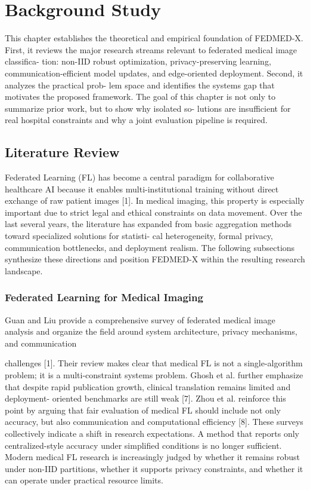 \chapter{Background Study}
This chapter establishes the theoretical and empirical foundation of FEDMED-X. First, it reviews the major research streams relevant to federated medical image classifica- tion: non-IID robust optimization, privacy-preserving learning, communication-efficient model updates, and edge-oriented deployment. Second, it analyzes the practical prob- lem space and identifies the systems gap that motivates the proposed framework. The goal of this chapter is not only to summarize prior work, but to show why isolated so- lutions are insufficient for real hospital constraints and why a joint evaluation pipeline is required.
\section{Literature Review}
Federated Learning (FL) has become a central paradigm for collaborative healthcare AI because it enables multi-institutional training without direct exchange of raw patient images [1]. In medical imaging, this property is especially important due to strict legal and ethical constraints on data movement. Over the last several years, the literature has expanded from basic aggregation methods toward specialized solutions for statisti- cal heterogeneity, formal privacy, communication bottlenecks, and deployment realism.
The following subsections synthesize these directions and position FEDMED-X within the resulting research landscape.
\subsection{Federated Learning for Medical Imaging}
Guan and Liu provide a comprehensive survey of federated medical image analysis and organize the field around system architecture, privacy mechanisms, and communication

challenges [1].
Their review makes clear that medical FL is not a single-algorithm problem; it is a multi-constraint systems problem. Ghosh et al. further emphasize that despite rapid publication growth, clinical translation remains limited and deployment- oriented benchmarks are still weak [7]. Zhou et al. reinforce this point by arguing that fair evaluation of medical FL should include not only accuracy, but also communication and computational efficiency [8].
These surveys collectively indicate a shift in research expectations. A method that reports only centralized-style accuracy under simplified conditions is no longer sufficient.
Modern medical FL research is increasingly judged by whether it remains robust under non-IID partitions, whether it supports privacy constraints, and whether it can operate under practical resource limits.
